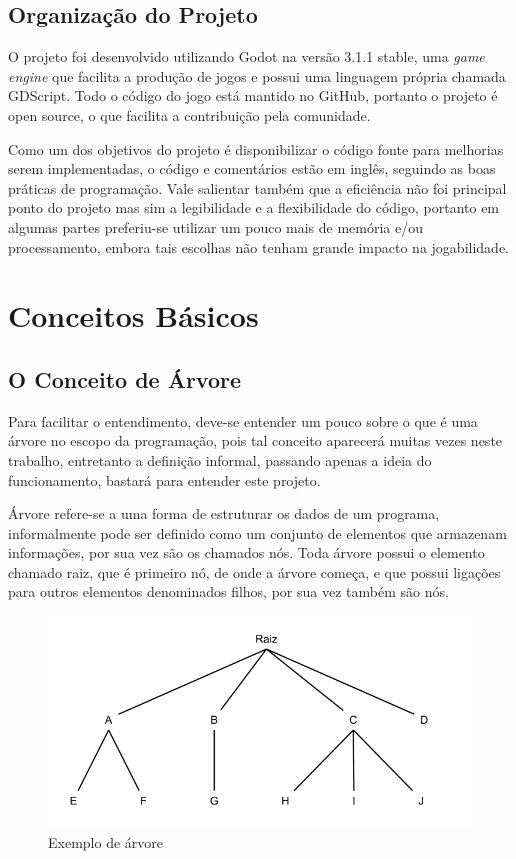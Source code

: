 \section{Organização do Projeto}
\label{sec:consideracoes_preliminares}

O projeto foi desenvolvido utilizando Godot na versão 3.1.1 stable, 
uma \textit{game engine} que facilita a produção de jogos e possui uma linguagem
própria chamada GDScript.
Todo o código do jogo está mantido no GitHub, portanto o projeto é open source,
o que facilita a contribuição pela comunidade.

Como um dos objetivos do projeto é disponibilizar o código fonte para
melhorias serem implementadas, o código e comentários estão em inglês, seguindo
as boas práticas de programação. Vale salientar também que a eficiência não foi
principal ponto do projeto mas sim a legibilidade e a flexibilidade do 
código, portanto em algumas partes preferiu-se utilizar um pouco mais de memória
e/ou processamento, embora tais escolhas não tenham grande impacto na 
jogabilidade.

\chapter{Conceitos Básicos}
\label{cap:Conceitos Básicos}

\section{O Conceito de Árvore}

Para facilitar o entendimento, deve-se entender um pouco sobre o que
é uma árvore no escopo da programação, pois tal conceito aparecerá muitas
vezes neste trabalho, entretanto a definição informal, passando apenas a ideia 
do funcionamento, bastará para entender este projeto.

Árvore refere-se a uma forma de estruturar os dados de um programa,
informalmente pode ser definido como um conjunto de elementos que armazenam 
informações, por sua vez são os chamados nós. Toda árvore possui o elemento 
chamado raiz, que é primeiro nó, de onde a árvore começa, e que possui ligações
para outros elementos denominados filhos, por sua vez também são nós.

\begin{figure}[h]
    \includegraphics[width=\linewidth]{../figuras/arvore.png}
    \caption{Exemplo de árvore}
\end{figure}   

